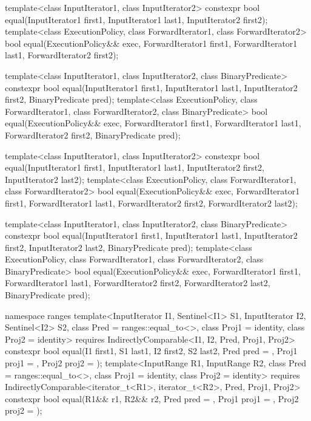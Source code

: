 %
\begin{itemdecl}
template<class InputIterator1, class InputIterator2>
  constexpr bool equal(InputIterator1 first1, InputIterator1 last1,
                       InputIterator2 first2);
template<class ExecutionPolicy, class ForwardIterator1, class ForwardIterator2>
  bool equal(ExecutionPolicy&& exec,
             ForwardIterator1 first1, ForwardIterator1 last1,
             ForwardIterator2 first2);

template<class InputIterator1, class InputIterator2,
         class BinaryPredicate>
  constexpr bool equal(InputIterator1 first1, InputIterator1 last1,
                       InputIterator2 first2, BinaryPredicate pred);
template<class ExecutionPolicy, class ForwardIterator1, class ForwardIterator2,
         class BinaryPredicate>
  bool equal(ExecutionPolicy&& exec,
             ForwardIterator1 first1, ForwardIterator1 last1,
             ForwardIterator2 first2, BinaryPredicate pred);

template<class InputIterator1, class InputIterator2>
  constexpr bool equal(InputIterator1 first1, InputIterator1 last1,
                       InputIterator2 first2, InputIterator2 last2);
template<class ExecutionPolicy, class ForwardIterator1, class ForwardIterator2>
  bool equal(ExecutionPolicy&& exec,
             ForwardIterator1 first1, ForwardIterator1 last1,
             ForwardIterator2 first2, ForwardIterator2 last2);

template<class InputIterator1, class InputIterator2,
         class BinaryPredicate>
  constexpr bool equal(InputIterator1 first1, InputIterator1 last1,
                       InputIterator2 first2, InputIterator2 last2,
                       BinaryPredicate pred);
template<class ExecutionPolicy, class ForwardIterator1, class ForwardIterator2,
         class BinaryPredicate>
  bool equal(ExecutionPolicy&& exec,
             ForwardIterator1 first1, ForwardIterator1 last1,
             ForwardIterator2 first2, ForwardIterator2 last2,
             BinaryPredicate pred);

namespace ranges {
  template<InputIterator I1, Sentinel<I1> S1, InputIterator I2, Sentinel<I2> S2,
           class Pred = ranges::equal_to<>, class Proj1 = identity, class Proj2 = identity>
    requires IndirectlyComparable<I1, I2, Pred, Proj1, Proj2>
    constexpr bool equal(I1 first1, S1 last1, I2 first2, S2 last2,
                         Pred pred = {},
                         Proj1 proj1 = {}, Proj2 proj2 = {});
  template<InputRange R1, InputRange R2, class Pred = ranges::equal_to<>,
           class Proj1 = identity, class Proj2 = identity>
    requires IndirectlyComparable<iterator_t<R1>, iterator_t<R2>, Pred, Proj1, Proj2>
    constexpr bool equal(R1&& r1, R2&& r2, Pred pred = {},
                         Proj1 proj1 = {}, Proj2 proj2 = {});
}
\end{itemdecl}

